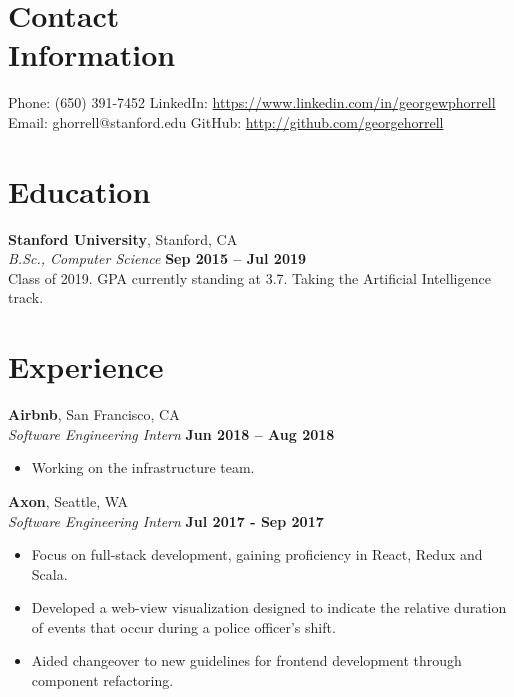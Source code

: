 \documentclass[margin,line]{resume}
\begin{document}
\begin{resume}
    \section{\mysidestyle Contact\\Information}

    Phone: (650) 391-7452       \hfill LinkedIn: \url{https://www.linkedin.com/in/georgewphorrell} \\
    \noindent Email: ghorrell@stanford.edu  \hfill GitHub: \url{http://github.com/georgehorrell} \vspace{0mm}\\\vspace{-4.5mm}

    \section{\mysidestyle Education}

    \textbf{Stanford University}, Stanford, CA \vspace{2mm}\\\vspace{1mm}%
    \textsl{B.Sc., Computer Science} \hfill \textbf{Sep 2015 -- Jul 2019}\\
    Class of 2019. GPA currently standing at 3.7. Taking the Artificial Intelligence track.

    \section{\mysidestyle Experience}
    
    \textbf{Airbnb}, San Francisco, CA \vspace{2mm}\\\vspace{1mm}%
    \textsl{Software Engineering Intern} \hfill \textbf{Jun 2018 -- Aug 2018}
    \begin{itemize}
    \item Working on the infrastructure team.
	\end{itemize}
    
    \textbf{Axon}, Seattle, WA \vspace{2mm}\\\vspace{1mm}%
    \textsl{Software Engineering Intern} \hfill \textbf{Jul 2017 - Sep 2017}
    \begin{itemize}
    \item Focus on full-stack development, gaining proficiency in React, Redux and Scala. 
	\item Developed a web-view visualization designed to indicate the relative duration of events that occur during a police officer's shift.
    \item Aided changeover to new guidelines for frontend development through component refactoring.
	\end{itemize}
    

\end{resume}
\end{document}
